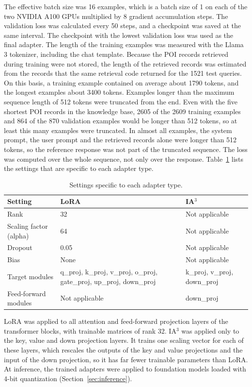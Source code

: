 \documentclass[journal,article,submit,pdftex,moreauthors]{Definitions/mdpi}
\begin{document}
The effective batch size was 16 examples, which is a batch size of 1 on each of the two NVIDIA A100 GPUs multiplied by 8 gradient accumulation steps. The validation loss was calculated every 50 steps, and a checkpoint was saved at the same interval. The checkpoint with the lowest validation loss was used as the final adapter. The length of the training examples was measured with the Llama 3 tokenizer, including the chat template. Because the POI records retrieved during training were not stored, the length of the retrieved records was estimated from the records that the same retrieval code returned for the 1521 test queries. On this basis, a training example contained on average about 1790 tokens, and the longest examples about 3400 tokens. Examples longer than the maximum sequence length of 512 tokens were truncated from the end. Even with the five shortest POI records in the knowledge base, 2605 of the 2609 training examples and 864 of the 870 validation examples would be longer than 512 tokens, so at least this many examples were truncated. In almost all examples, the system prompt, the user prompt and the retrieved records alone were longer than 512 tokens, so the reference response was not part of the truncated sequence. The loss was computed over the whole sequence, not only over the response. Table~\ref{tab:train_adapter} lists the settings that are specific to each adapter type.

\begin{table}[H]
\caption{Settings specific to each adapter type.}\label{tab:train_adapter}
\begin{tabularx}{\textwidth}{lXX}
\toprule
Setting & LoRA & IA$^3$\\
\midrule
Rank & 32 & Not applicable\\
Scaling factor (alpha) & 64 & Not applicable\\
Dropout & 0.05 & Not applicable\\
Bias & None & Not applicable\\
Target modules & q\_proj, k\_proj, v\_proj, o\_proj, gate\_proj, up\_proj, down\_proj & k\_proj, v\_proj, down\_proj\\
Feed-forward modules & Not applicable & down\_proj\\
\bottomrule
\end{tabularx}
\end{table}

LoRA was applied to all attention and feed-forward projection layers of the transformer blocks, with trainable matrices of rank 32. IA$^3$ was applied only to the key, value and down projection layers. It trains one scaling vector for each of these layers, which rescales the outputs of the key and value projections and the input of the down projection, so it has far fewer trainable parameters than LoRA. At inference, the trained adapters were applied to foundation models loaded with 4-bit quantization (Section~\ref{sec:inference}).
\end{document}
